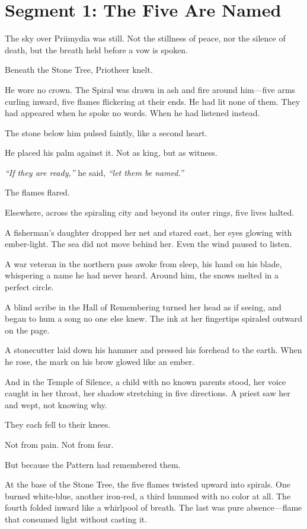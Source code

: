 \documentclass[9pt]{article}
\begin{document}
\newpage

\section*{Segment 1: The Five Are Named}

The sky over Priimydia was still. Not the stillness of peace, nor the silence of death, but the breath held before a vow is spoken.

Beneath the Stone Tree, Priotheer knelt.

He wore no crown. The Spiral was drawn in ash and fire around him—five arms curling inward, five flames flickering at their ends. He had lit none of them. They had appeared when he spoke no words. When he had listened instead.

The stone below him pulsed faintly, like a second heart.

He placed his palm against it. Not as king, but as witness.

\emph{``If they are ready,''} he said, \emph{``let them be named.''}

The flames flared.

Elsewhere, across the spiraling city and beyond its outer rings, five lives halted.

A fisherman's daughter dropped her net and stared east, her eyes glowing with ember-light. The sea did not move behind her. Even the wind paused to listen.

A war veteran in the northern pass awoke from sleep, his hand on his blade, whispering a name he had never heard. Around him, the snows melted in a perfect circle.

A blind scribe in the Hall of Remembering turned her head as if seeing, and began to hum a song no one else knew. The ink at her fingertips spiraled outward on the page.

A stonecutter laid down his hammer and pressed his forehead to the earth. When he rose, the mark on his brow glowed like an ember.

And in the Temple of Silence, a child with no known parents stood, her voice caught in her throat, her shadow stretching in five directions. A priest saw her and wept, not knowing why.

They each fell to their knees.

Not from pain. Not from fear.

But because the Pattern had remembered them.

At the base of the Stone Tree, the five flames twisted upward into spirals. One burned white-blue, another iron-red, a third hummed with no color at all. The fourth folded inward like a whirlpool of breath. The last was pure absence—flame that consumed light without casting it.
\end{document}
